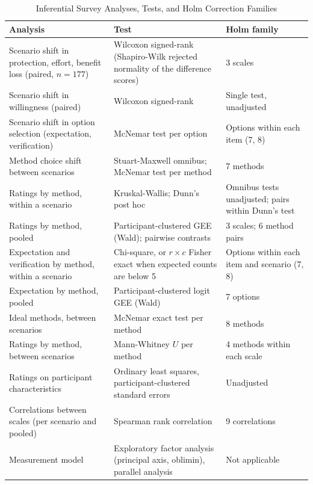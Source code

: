 \documentclass[conference,compsoc]{IEEEtran}
\begin{document}
\begin{table}[t]
\centering
\caption{Inferential Survey Analyses, Tests, and Holm Correction Families}
\label{tab:analysis-families}
\small
\begin{tabular}{@{}p{}p{}p{}@{}}
\toprule
Analysis & Test & Holm family \\
\midrule
Scenario shift in protection, effort, benefit loss (paired, $n=177$)
  & Wilcoxon signed-rank (Shapiro-Wilk rejected normality of the difference scores)
  & 3 scales \\
Scenario shift in willingness (paired)
  & Wilcoxon signed-rank
  & Single test, unadjusted \\
Scenario shift in option selection (expectation, verification)
  & McNemar test per option
  & Options within each item (7, 8) \\
Method choice shift between scenarios
  & Stuart-Maxwell omnibus; McNemar test per method
  & 7 methods \\
Ratings by method, within a scenario
  & Kruskal-Wallis; Dunn's post hoc
  & Omnibus tests unadjusted; pairs within Dunn's test \\
Ratings by method, pooled
  & Participant-clustered GEE (Wald); pairwise contrasts
  & 3 scales; 6 method pairs \\
Expectation and verification by method, within a scenario
  & Chi-square, or $r\times c$ Fisher exact when expected counts are below 5
  & Options within each item and scenario (7, 8) \\
Expectation by method, pooled
  & Participant-clustered logit GEE (Wald)
  & 7 options \\
Ideal methods, between scenarios
  & McNemar exact test per method
  & 8 methods \\
Ratings by method, between scenarios
  & Mann-Whitney $U$ per method
  & 4 methods within each scale \\
Ratings on participant characteristics
  & Ordinary least squares, participant-clustered standard errors
  & Unadjusted \\
Correlations between scales (per scenario and pooled)
  & Spearman rank correlation
  & 9 correlations \\
Measurement model
  & Exploratory factor analysis (principal axis, oblimin), parallel analysis
  & Not applicable \\
\bottomrule
\end{tabular}
\end{table}
\end{document}
